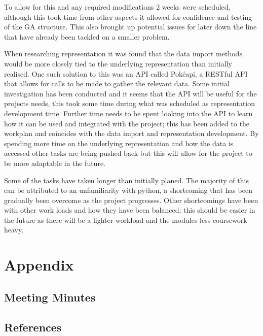 \documentclass[a4paper]{article}
\newcommand{\Pokeapi}{Pok\'{e}api}
\begin{document}
To allow for this and any required modifications 2 weeks were scheduled, although this took time from other aspects it allowed for confidence and testing of the GA structure.
This also brought up potential issues for later down the line that have already been tackled on a smaller problem.
\par
When researching representation it was found that the data import methods would be more closely tied to the underlying representation than initially realised.
One such solution to this was an API called \Pokeapi{}, a RESTful API that allows for calls to be made to gather the relevant data.
Some initial investigation has been conducted and it seems that the API will be useful for the projects needs, this took some time during what was scheduled as representation development time.
Further time needs to be spent looking into the API to learn how it can be used and integrated with the project; this has been added to the workplan and coincides with the data import and representation development.
By spending more time on the underlying representation and how the data is accessed other tasks are being pushed back but this will allow for the project to be more adaptable in the future.
\par
Some of the tasks have taken longer than initially planed.
The majority of this can be attributed to an unfamiliarity with python, a shortcoming that has been gradually been overcome as the project progresses.
Other shortcomings have been with other work loads and how they have been balanced; this should be easier in the future as there will be a lighter workload and the modules less coursework heavy.



\section{Appendix}
\subsection{Meeting Minutes}

\subsection{References}


\end{document}
